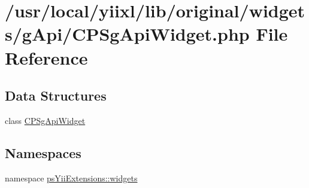 \hypertarget{CPSgApiWidget_8php}{
\section{/usr/local/yiixl/lib/original/widgets/gApi/CPSgApiWidget.php File Reference}
\label{CPSgApiWidget_8php}
}
\subsection*{Data Structures}
\begin{DoxyCompactItemize}
\item 
class \hyperlink{classCPSgApiWidget}{CPSgApiWidget}
\end{DoxyCompactItemize}
\subsection*{Namespaces}
\begin{DoxyCompactItemize}
\item 
namespace \hyperlink{namespacepsYiiExtensions_1_1widgets}{psYiiExtensions::widgets}
\end{DoxyCompactItemize}
